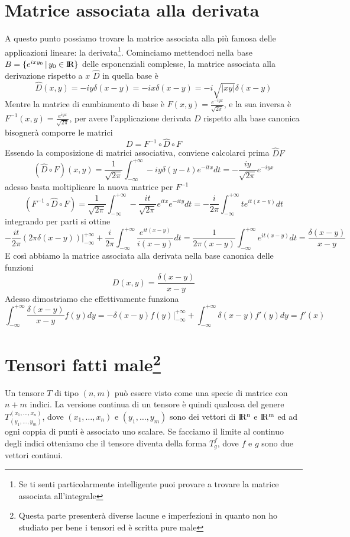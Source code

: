 \documentclass[11pt,a4paper]{article}
\theoremstyle{definition}
\theoremstyle{plain}
\theoremstyle{plain}
\begin{document}
	\section{Matrice associata alla derivata}
		A questo punto possiamo trovare la matrice associata alla più famosa delle applicazioni lineare: la derivata\footnote{Se ti senti particolarmente intelligente puoi provare a trovare la matrice associata all'integrale}.\newline
		Cominciamo mettendoci nella base $B=\{e^{ixy_0}\,|\,y_0 \in \rm I\!R \}$ delle esponenziali complesse, la matrice associata alla derivazione rispetto a $x$ $\widehat{D}$ in quella base è 
		\begin{equation}
			\widehat{D}(x,y)=-iy\delta (x-y)=-ix\delta(x-y)=-i\sqrt{|xy|}\delta(x-y)
		\end{equation}
		Mentre la matrice di cambiamento di base è $F(x,y)=\frac{e^{-iyx}}{\sqrt{2\pi}}$, e la sua inversa è $F^{-1}(x,y)=\frac{e^{iyx}}{\sqrt{2\pi}}$, per avere l'applicazione derivata $D$ rispetto alla base canonica bisognerà comporre le matrici
		\begin{equation}
			D=F^{-1}\circ \widehat{D}\circ F
		\end{equation}
		Essendo la composizione di matrici associativa, conviene calcolarci prima $\widehat{D}F$
		\[
			(\widehat{D}\circ F)(x,y)=\frac{1}{\sqrt{2\pi}}\int_{-\infty}^{+\infty}
			-iy\delta(y-t)e^{-itx}dt=-\frac{iy}{\sqrt{2\pi}}e^{-iyx}
		\]
		adesso basta moltiplicare la nuova matrice per $F^{-1}$
		\[
			(F^{-1}\circ \widehat{D}\circ F)=
			\frac{1}{\sqrt{2\pi}}\int_{-\infty}^{+\infty}-\frac{it}{\sqrt{2\pi}}e^{itx}e^{-ity}dt=
			-\frac{i}{2\pi}\int_{-\infty}^{+\infty}te^{it(x-y)}dt
		\]
		integrando per parti si ottine
		\[
			-\frac{it}{2\pi}(2\pi\delta(x-y))\bigg\rvert_{-\infty}^{+\infty}+
			\frac{i}{2\pi}\int_{-\infty}^{+\infty}\frac{e^{it(x-y)}}{i(x-y)}dt=
			\frac{1}{2\pi(x-y)}\int_{-\infty}^{+\infty}e^{it(x-y)}dt=\frac{\delta(x-y)}{x-y}
		\]
		E così abbiamo la matrice associata alla derivata nella base canonica delle funzioni
		\begin{equation}
			D(x,y)=\frac{\delta(x-y)}{x-y}
		\end{equation}
		Adesso dimostriamo che effettivamente funziona
		\[
			\int_{-\infty}^{+\infty}\frac{\delta(x-y)}{x-y}f(y)dy=-\delta(x-y)f(y)\big\rvert_{-\infty}^{+\infty}+\int_{-\infty}^{+\infty}\delta(x-y)f'(y)dy=f'(x)
		\]

	\section{Tensori fatti male\footnote{Questa parte presenterà diverse lacune e imperfezioni in quanto non ho studiato per bene i tensori ed è scritta pure male}}
		Un tensore $T$ di tipo $(n,m)$ può essere visto come una specie di matrice con $n+m$ indici. La versione continua di un tensore è quindi qualcosa del genere $T^{(x_1,\dots,x_n)}_{(y_1,\dots,y_m)}$, dove $(x_1,\dots,x_n)$ e $(y_1,\dots,y_m)$ sono dei vettori di $\rm I\!R^n$ e $\rm I\!R^m$ ed ad ogni coppia di punti è associato uno scalare.\newline
		Se facciamo il limite al continuo degli indici otteniamo che il tensore diventa della forma $T^{f}_{g}$, dove $f$ e $g$ sono due vettori continui.
\end{document}
